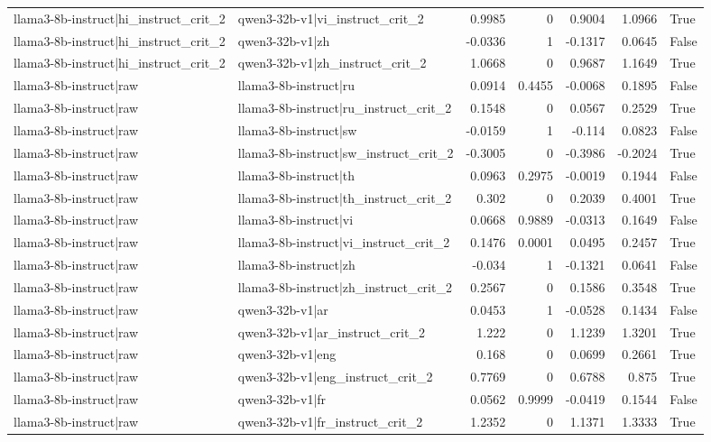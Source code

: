 \begin{table}
\begin{tabular}{l l r r r r l}
llama3-8b-instruct|hi_instruct_crit_2 & qwen3-32b-v1|vi_instruct_crit_2 & 0.9985 & 0 & 0.9004 & 1.0966 & True \\
llama3-8b-instruct|hi_instruct_crit_2 & qwen3-32b-v1|zh & -0.0336 & 1 & -0.1317 & 0.0645 & False \\
llama3-8b-instruct|hi_instruct_crit_2 & qwen3-32b-v1|zh_instruct_crit_2 & 1.0668 & 0 & 0.9687 & 1.1649 & True \\
llama3-8b-instruct|raw & llama3-8b-instruct|ru & 0.0914 & 0.4455 & -0.0068 & 0.1895 & False \\
llama3-8b-instruct|raw & llama3-8b-instruct|ru_instruct_crit_2 & 0.1548 & 0 & 0.0567 & 0.2529 & True \\
llama3-8b-instruct|raw & llama3-8b-instruct|sw & -0.0159 & 1 & -0.114 & 0.0823 & False \\
llama3-8b-instruct|raw & llama3-8b-instruct|sw_instruct_crit_2 & -0.3005 & 0 & -0.3986 & -0.2024 & True \\
llama3-8b-instruct|raw & llama3-8b-instruct|th & 0.0963 & 0.2975 & -0.0019 & 0.1944 & False \\
llama3-8b-instruct|raw & llama3-8b-instruct|th_instruct_crit_2 & 0.302 & 0 & 0.2039 & 0.4001 & True \\
llama3-8b-instruct|raw & llama3-8b-instruct|vi & 0.0668 & 0.9889 & -0.0313 & 0.1649 & False \\
llama3-8b-instruct|raw & llama3-8b-instruct|vi_instruct_crit_2 & 0.1476 & 0.0001 & 0.0495 & 0.2457 & True \\
llama3-8b-instruct|raw & llama3-8b-instruct|zh & -0.034 & 1 & -0.1321 & 0.0641 & False \\
llama3-8b-instruct|raw & llama3-8b-instruct|zh_instruct_crit_2 & 0.2567 & 0 & 0.1586 & 0.3548 & True \\
llama3-8b-instruct|raw & qwen3-32b-v1|ar & 0.0453 & 1 & -0.0528 & 0.1434 & False \\
llama3-8b-instruct|raw & qwen3-32b-v1|ar_instruct_crit_2 & 1.222 & 0 & 1.1239 & 1.3201 & True \\
llama3-8b-instruct|raw & qwen3-32b-v1|eng & 0.168 & 0 & 0.0699 & 0.2661 & True \\
llama3-8b-instruct|raw & qwen3-32b-v1|eng_instruct_crit_2 & 0.7769 & 0 & 0.6788 & 0.875 & True \\
llama3-8b-instruct|raw & qwen3-32b-v1|fr & 0.0562 & 0.9999 & -0.0419 & 0.1544 & False \\
llama3-8b-instruct|raw & qwen3-32b-v1|fr_instruct_crit_2 & 1.2352 & 0 & 1.1371 & 1.3333 & True \\

\end{tabular}
\end{table}
